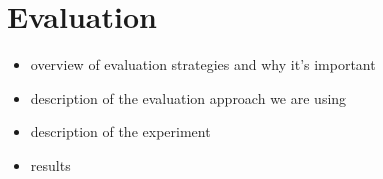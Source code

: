 \chapter{Evaluation}
\label{chap:Evaluation}

\begin{itemize}
    \item overview of evaluation strategies and why it's important
    \item description of the evaluation approach we are using
    \item description of the experiment
    \item results
\end{itemize}